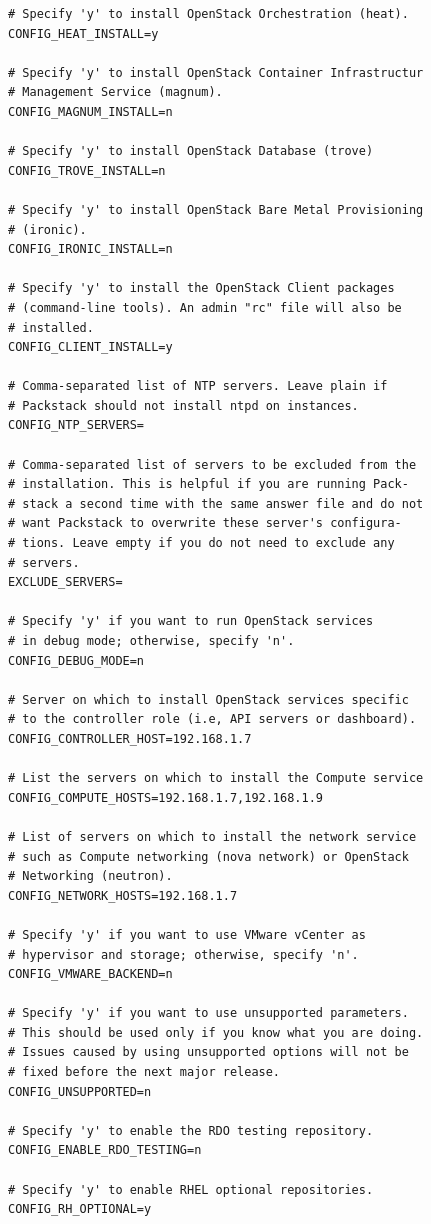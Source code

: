 \documentclass[12pt,a4paper,oneside]{book}
\begin{document}
\begin{lstlisting}[style=codigobase,  caption= answers.cfg]
# Specify 'y' to install OpenStack Orchestration (heat).
CONFIG_HEAT_INSTALL=y

# Specify 'y' to install OpenStack Container Infrastructur
# Management Service (magnum).
CONFIG_MAGNUM_INSTALL=n

# Specify 'y' to install OpenStack Database (trove)
CONFIG_TROVE_INSTALL=n

# Specify 'y' to install OpenStack Bare Metal Provisioning 
# (ironic).
CONFIG_IRONIC_INSTALL=n

# Specify 'y' to install the OpenStack Client packages 
# (command-line tools). An admin "rc" file will also be 
# installed.
CONFIG_CLIENT_INSTALL=y

# Comma-separated list of NTP servers. Leave plain if 
# Packstack should not install ntpd on instances.
CONFIG_NTP_SERVERS=

# Comma-separated list of servers to be excluded from the
# installation. This is helpful if you are running Pack-
# stack a second time with the same answer file and do not
# want Packstack to overwrite these server's configura-
# tions. Leave empty if you do not need to exclude any 
# servers.
EXCLUDE_SERVERS=

# Specify 'y' if you want to run OpenStack services
# in debug mode; otherwise, specify 'n'.
CONFIG_DEBUG_MODE=n

# Server on which to install OpenStack services specific 
# to the controller role (i.e, API servers or dashboard).
CONFIG_CONTROLLER_HOST=192.168.1.7

# List the servers on which to install the Compute service
CONFIG_COMPUTE_HOSTS=192.168.1.7,192.168.1.9

# List of servers on which to install the network service 
# such as Compute networking (nova network) or OpenStack 
# Networking (neutron).
CONFIG_NETWORK_HOSTS=192.168.1.7

# Specify 'y' if you want to use VMware vCenter as 
# hypervisor and storage; otherwise, specify 'n'.
CONFIG_VMWARE_BACKEND=n

# Specify 'y' if you want to use unsupported parameters.
# This should be used only if you know what you are doing.
# Issues caused by using unsupported options will not be 
# fixed before the next major release.
CONFIG_UNSUPPORTED=n

# Specify 'y' to enable the RDO testing repository.
CONFIG_ENABLE_RDO_TESTING=n

# Specify 'y' to enable RHEL optional repositories.
CONFIG_RH_OPTIONAL=y


\end{lstlisting}
\end{document}
